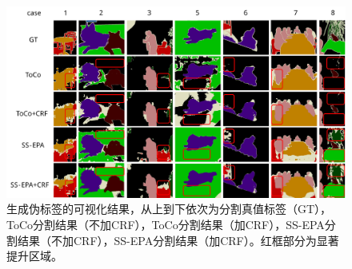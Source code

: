 \begin{figure}[htbp]
    \centerline{\includegraphics[width=6in]{fig/fig6.pdf}}
    \begin{CJK*}{UTF8}{fs}
        \caption{生成伪标签的可视化结果，从上到下依次为分割真值标签（GT），ToCo分割结果（不加CRF），ToCo分割结果（加CRF），SS-EPA分割结果（不加CRF），SS-EPA分割结果（加CRF）。红框部分为显著提升区域。}\label{fig6}
    \end{CJK*}
\end{figure}

